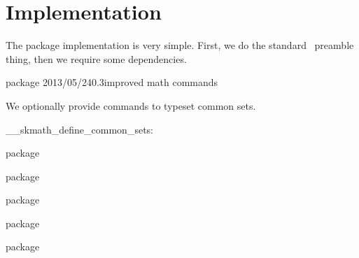 \documentclass[commonsets,load]{skdoc}
\begin{document}
  \section{Implementation}
  The package implementation is very simple. First, we do the standard
  \LaTeXe\ preamble thing, then we require some dependencies.
\begin{MacroCode}{package}
\RequirePackage{expl3,l3keys2e,xparse}
    {2013/05/24}{0.3}{improved math commands}
\RequirePackage{amssymb,mathtools,xfrac,isomath}
\end{MacroCode}

  We optionally provide commands to typeset common sets.
  \begin{macro}{\__skmath_define_common_sets:}
\begin{MacroCode}{package}
\cs_new:Nn\__skmath_define_common_sets:{
\end{MacroCode}
  \begin{macro}{\N}
\begin{MacroCode}{package}
  \NewDocumentCommand{}
\end{MacroCode}
  \end{macro}
  \begin{macro}{\Z}
\begin{MacroCode}{package}
  \NewDocumentCommand{}
\end{MacroCode}
  \end{macro}
  \begin{macro}{\Q}
\begin{MacroCode}{package}
  \NewDocumentCommand{}
\end{MacroCode}
  \end{macro}
  \begin{macro}{\R}
\begin{MacroCode}{package}
  \NewDocumentCommand{}
\end{MacroCode}
  \end{macro}
  \begin{macro}{\C}
\begin{MacroCode}{package}
  \NewDocumentCommand{}
\end{MacroCode}
  \end{macro}
\begin{MacroCode}{package}
}
\end{MacroCode}
  \end{macro}
 
\end{document}

